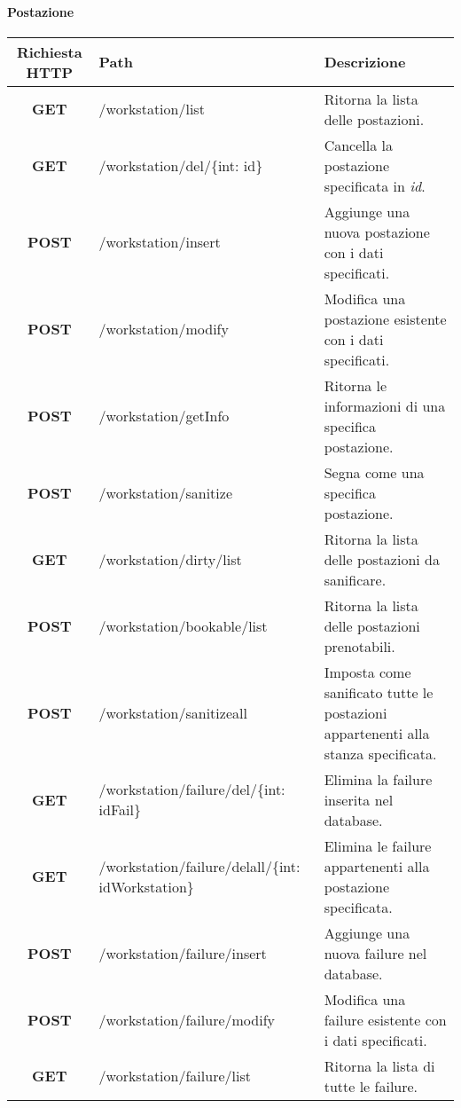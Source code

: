 \paragraph{Postazione}
\begin{center}
	\begin{longtable}{|c|p{7cm}|p{5cm}|}
		\hline
		\rowcolor{lighter-grayer}
		\textbf{Richiesta HTTP} & \textbf{Path} & \textbf{Descrizione}\\		
		\hline
		\endfirsthead
		\textbf{GET} & /workstation/list & Ritorna la lista delle postazioni.\\
		\hline
		\textbf{GET} & /workstation/del/\{int: id\} & Cancella la postazione specificata in \textit{id}.\\
		\hline
		\textbf{POST} & /workstation/insert & Aggiunge una nuova postazione con i dati specificati.\\
		\hline
		\textbf{POST} & /workstation/modify & Modifica una postazione esistente con i dati specificati.\\
		\hline
		\textbf{POST} & /workstation/getInfo & Ritorna le informazioni di una specifica postazione.\\
		\hline
		\textbf{POST} & /workstation/sanitize & Segna come \glock{sanificata} una specifica postazione.\\
		\hline
		\textbf{GET} & /workstation/dirty/list & Ritorna la lista delle postazioni da sanificare.\\
		\hline
		\textbf{POST} & /workstation/bookable/list & Ritorna la lista delle postazioni prenotabili.\\
		\hline
		\textbf{POST} & /workstation/sanitizeall & Imposta come sanificato tutte le postazioni appartenenti alla stanza specificata.\\
		\hline
		\textbf{GET} & /workstation/failure/del/\{int: idFail\} & Elimina la failure inserita nel database.\\
		\hline
		\textbf{GET} & /workstation/failure/delall/\{int: idWorkstation\} & Elimina le failure appartenenti alla postazione specificata.\\
		\hline
		\textbf{POST} & /workstation/failure/insert & Aggiunge una nuova failure nel database.\\
		\hline
		\textbf{POST} & /workstation/failure/modify & Modifica una failure esistente con i dati specificati.\\
		\hline
		\textbf{GET} & /workstation/failure/list & Ritorna la lista di tutte le failure.\\
		\hline
	\end{longtable}
\end{center}
